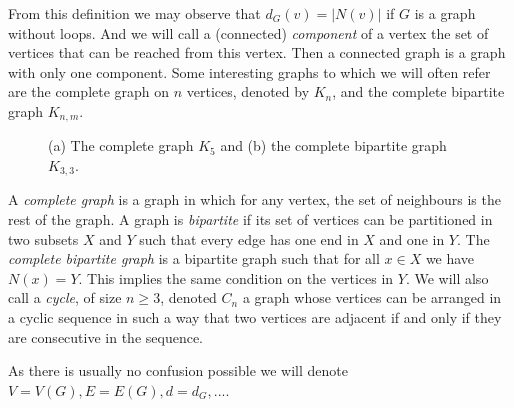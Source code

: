 From this definition we may observe that $d_G(v) = |N(v)|$ if $G$ is a graph without loops. 
And we will call a (connected) \emph{component} of a vertex the set of vertices that can be reached from this vertex. 
Then a connected graph is a graph with only one component.
\newline
Some interesting graphs to which we will often refer are the complete graph on $n$ vertices, denoted by $K_n$, and the complete bipartite graph $K_{n,m}$. 
\begin{figure}
	\caption{ (a) The complete graph $K_5$ and (b) the complete bipartite graph $K_{3,3}$.}
\end{figure}
A \emph{complete graph} is a graph in which for any vertex, the set of neighbours is the rest of the graph. 
A graph is \emph{bipartite} if its set of vertices can be partitioned in two subsets $X$ and $Y$ such that every edge has one end in $X$ and one in $Y$. 
The \emph{complete bipartite graph} is a bipartite graph such that for all $x \in X$ we have $N(x) = Y$. 
This implies the same condition on the vertices in $Y$.
We will also call a \emph{cycle}, of size $n \geq 3$, denoted $C_n$ a graph whose vertices can be arranged in a cyclic sequence in such a way that two vertices are adjacent if and only if they are consecutive in the sequence.

As there is usually no confusion possible we will denote $V = V(G), E =E(G), d = d_G, ...$. 


